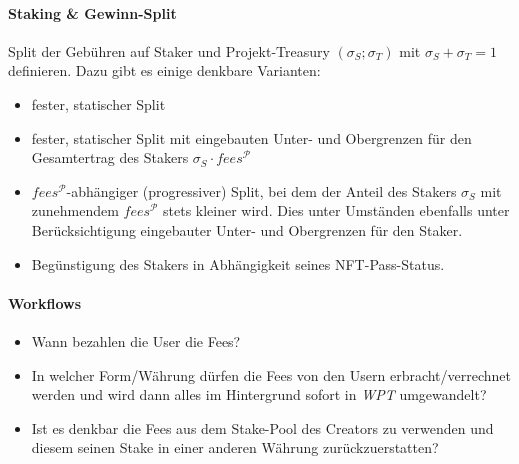 \paragraph{Staking \& Gewinn-Split}
\textbf{ }
\vspace{0.3cm}

\vspace{0.5cm}

Split der Gebühren auf Staker und Projekt-Treasury $(\sigma_{S}; \sigma_{T})$ mit $\sigma_{S} + \sigma_{T} = 1$ definieren. Dazu gibt es einige denkbare Varianten:

\begin{itemize}
	\item fester, statischer Split
	\item fester, statischer Split mit eingebauten Unter- und Obergrenzen für den Gesamtertrag des Stakers $\sigma_{S} \cdot fees^{\mathcal{P}}$
	\item $fees^{\mathcal{P}}$-abhängiger (progressiver) Split, bei dem der Anteil des Stakers $\sigma_{S}$ mit zunehmendem $fees^{\mathcal{P}}$ stets kleiner wird. Dies unter Umständen ebenfalls unter Berücksichtigung eingebauter Unter- und Obergrenzen für den Staker.
	\item Begünstigung des Stakers in Abhängigkeit seines NFT-Pass-Status.
\end{itemize}

\vspace{0.5cm}


\paragraph{Workflows}
\textbf{ }
\vspace{0.3cm}

\vspace{0.5cm}

\begin{itemize}
	\item Wann bezahlen die User die Fees?
	\item In welcher Form/Währung dürfen die Fees von den Usern erbracht/verrechnet werden und wird dann alles im Hintergrund sofort in \textit{WPT} umgewandelt?
	\item Ist es denkbar die Fees aus dem Stake-Pool des Creators zu verwenden und diesem seinen Stake in einer anderen Währung zurückzuerstatten?
\end{itemize}

\vspace{0.5cm}


